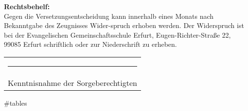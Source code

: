 {\begin{minipage}[t][.98\textheight][t]{.97\textwidth}
			\vfill
			{\footnotesize \textbf{Rechtsbehelf:}\\
				Gegen die Versetzungsentscheidung kann innerhalb eines Monats nach Bekanntgabe des Zeugnisses Wider-spruch erhoben werden. Der Widerspruch ist bei der Evangelischen Gemeinschaftsschule Erfurt, Eugen-Richter-Straße 22, 99085 Erfurt schriftlich oder zur Niederschrift zu erheben.\\\vspace{1em}
				\begin{tabularx}{\linewidth}{C{.6\linewidth}}
					\vspace{2em}\rule{\linewidth}{1pt} \\
					\centering Kenntnisnahme der Sorgeberechtigten \\
				\end{tabularx}
			}
		\end{minipage}		
	}%
	\newpage
	\newpagedefs

	#tables

	\thispagestyle{mypagestyle}
